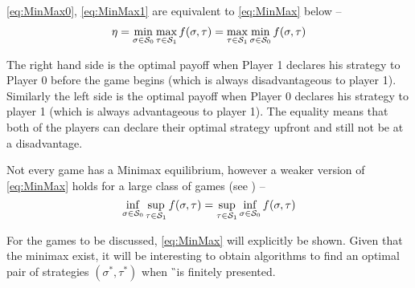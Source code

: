 \eqref{eq:MinMax0}, \eqref{eq:MinMax1} are equivalent to \eqref{eq:MinMax} below --
\begin{align}
    \eta = \min_{\sigma \in \mathcal{S}_0} \max_{\tau \in \mathcal{S}_1} f(\sigma, \tau) = \max_{\tau \in \mathcal{S}_1} \min_{\sigma \in \mathcal{S}_0 } f(\sigma,\tau) \label{eq:MinMax}
\end{align}

The right hand side is the optimal payoff when Player 1 declares his strategy to Player 0 before the game begins (which is always disadvantageous to player 1). Similarly the left side is the optimal payoff when Player 0 declares his strategy to player 1 (which is always advantageous to player 1). The equality means that both of the players can declare their optimal strategy upfront and still not be at a disadvantage.

Not every game has a Minimax equilibrium, however a weaker version of \eqref{eq:MinMax} holds for a large class of games (see \cite{roux_equilibria}) --
\[
    \inf_{\sigma \in \mathcal{S}_0} \sup_{\tau \in \mathcal{S}_1} f(\sigma, \tau) = \sup_{\tau \in \mathcal{S}_1} \inf_{\sigma \in \mathcal{S}_0 } f(\sigma,\tau)
\]

For the games to be discussed, \eqref{eq:MinMax} will explicitly be shown. Given that the minimax exist, it will be interesting to obtain algorithms to find an optimal pair of strategies $(\sigma^*,\tau^*)$ when \G\ is finitely presented.

